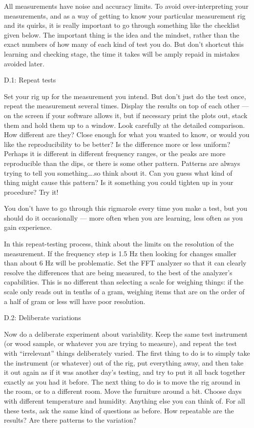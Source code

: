 
  All measurements have noise and accuracy limits. To avoid over-interpreting 
  your measurements, and as a way of getting to know your particular 
  measurement rig and its quirks, it is really important to go through 
  something like the checklist given below. The important thing is the idea and 
  the mindset, rather than the exact numbers of how many of each kind of test 
  you do. But don’t shortcut this learning and checking stage, the time it 
  takes will be amply repaid in mistakes avoided later. 

  D.1: Repeat tests 

  Set your rig up for the measurement you intend. But don’t just do the test 
  once, repeat the measurement several times. Display the results on top of 
  each other — on the screen if your software allows it, but if necessary print 
  the plots out, stack them and hold them up to a window. Look carefully at the 
  detailed comparison. How different are they? Close enough for what you wanted 
  to know, or would you like the reproducibility to be better? Is the 
  difference more or less uniform? Perhaps it is different in different 
  frequency ranges, or the peaks are more reproducible than the dips, or there 
  is some other pattern. Patterns are always trying to tell you something….so 
  think about it. Can you guess what kind of thing might cause this pattern? Is 
  it something you could tighten up in your procedure? Try it! 

  You don’t have to go through this rigmarole every time you make a test, but 
  you should do it occasionally — more often when you are learning, less often 
  as you gain experience. 

  In this repeat-testing process, think about the limits on the resolution of 
  the measurement. If the frequency step is 1.5 Hz then looking for changes 
  smaller than about 6 Hz will be problematic. Set the FFT analyzer so that it 
  can clearly resolve the differences that are being measured, to the best of 
  the analyzer’s capabilities. This is no different than selecting a scale for 
  weighing things: if the scale only reads out in tenths of a gram, weighing 
  items that are on the order of a half of gram or less will have poor 
  resolution. 

  D.2: Deliberate variations 

  Now do a deliberate experiment about variability. Keep the same test 
  instrument (or wood sample, or whatever you are trying to measure), and 
  repeat the test with “irrelevant” things deliberately varied. The first thing 
  to do is to simply take the instrument (or whatever) out of the rig, put 
  everything away, and then take it out again as if it was another day’s 
  testing, and try to put it all back together exactly as you had it before. 
  The next thing to do is to move the rig around in the room, or to a different 
  room. Move the furniture around a bit. Choose days with different temperature 
  and humidity. Anything else you can think of. For all these tests, ask the 
  same kind of questions as before. How repeatable are the results? Are there 
  patterns to the variation? 

